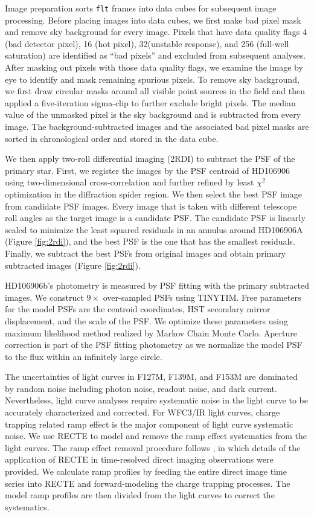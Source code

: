 \documentclass[twocolumn]{aastex62}
\begin{document}
Image preparation sorts \texttt{flt} frames into data cubes for subsequent image processing. Before placing images into data cubes, we first make bad pixel mask and remove sky background for every image. Pixels that have data quality flags 4 (bad detector pixel), 16 (hot pixel), 32(unstable response), and 256 (full-well saturation) are identified as ``bad pixels'' and excluded from subsequent analyses. After masking out pixels with those data quality flags, we examine the image by eye to identify and mask remaining spurious pixels. To remove sky background, we first draw circular masks around all visible point sources in the field and then applied a five-iteration sigma-clip to further exclude bright pixels. The median value of the unmasked pixel is the sky background and is subtracted from every image. The background-subtracted images and the associated bad pixel masks are sorted in chronological order and stored in the data cube.

We then apply two-roll differential imaging (2RDI) to subtract the PSF of the primary star. First, we register the images by the PSF centroid of HD106906 using two-dimensional cross-correlation and further refined by least $\chi^{2}$ optimization in the diffraction spider region. We then select the best PSF image from candidate PSF images. Every image that is taken with different telescope roll angles as the target image is a candidate PSF. The candidate PSF is linearly scaled to minimize the least squared residuals in an annulus around HD106906A (Figure \ref{fig:2rdi}), and the best PSF is the one that has the smallest residuals. Finally, we subtract the best PSFs from original images and obtain primary subtracted images (Figure \ref{fig:2rdi}). 

HD106906b's photometry is measured by PSF fitting with the primary subtracted images. We construct $9\times$ over-sampled PSFs using TINYTIM. Free parameters for the model PSFs are the centroid coordinates, HST secondary mirror displacement, and the scale of the PSF. We optimize these parameters using maximum likelihood method realized by Markov Chain Monte Carlo. Aperture correction is part of the PSF fitting photometry as we normalize the model PSF to the flux within an infinitely large circle. 

The uncertainties of light curves in F127M, F139M, and F153M are dominated by random noise including photon noise, readout noise, and dark current. Nevertheless, light curve analyses require systematic noise in the light curve to be accurately characterized and corrected. For WFC3/IR light curves, charge trapping related ramp effect is the major component of light curve systematic noise. We use RECTE \citep{Zhou2017} to model and remove the ramp effect systematics from the light curves. The ramp effect removal procedure follows \citet{Zhou2019}, in which  details of the application of RECTE in time-resolved direct imaging observations were provided. We calculate ramp profiles by feeding the entire direct image time series into RECTE and forward-modeling the charge trapping processes. The model ramp profiles are then divided from the light curves to correct the systematics.
\end{document}

